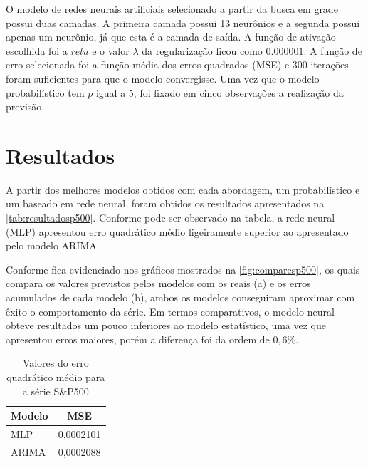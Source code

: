 \documentclass[
    12pt,
    oneside,
    a4paper,
    english,
    brazil
]{abntex2}
\begin{document}
O modelo  de redes neurais artificiais  selecionado a partir da  busca em grade
possui duas camadas.  A primeira camada possui 13 neurônios  e a segunda possui
apenas um  neurônio, já  que esta  é a camada  de saída.  A função  de ativação
escolhida  foi  a $relu$  e  o  valor  $\lambda$  da regularização  ficou  como
$0.000001$. A função de erro selecionada foi a função média dos erros quadrados
(MSE) e 300 iterações foram suficientes  para que o modelo convergisse. Uma vez
que o modelo probabilístico tem $p$ igual  a 5, foi fixado em cinco observações
a realização da previsão.

\chapter{Resultados}\label{chap:result}

A partir  dos melhores  modelos obtidos com  cada abordagem,  um probabilístico
e  um  baseado  em  rede  neural,  foram  obtidos  os  resultados  apresentados
na  \autoref{tab:resultadosp500}.  Conforme pode  ser  observado  na tabela,  a
rede neural  (MLP) apresentou  erro quadrático  médio ligeiramente  superior ao
apresentado pelo modelo ARIMA.

Conforme fica evidenciado nos gráficos mostrados na \autoref{fig:comparesp500},
os quais compara os valores previstos pelos modelos com os reais (a) e os erros
acumulados de cada modelo (b), ambos os modelos conseguiram aproximar com êxito
o  comportamento da  série.  Em  termos comparativos,  o  modelo neural  obteve
resultados um  pouco inferiores ao  modelo estatístico, uma vez  que apresentou
erros maiores, porém a diferença foi da ordem de $0,6\%$.

\begin{table}[ht]
    \centering
    \caption{Valores do erro quadrático médio para a série S\&P500}\label{tab:resultadosp500}
    \begin{tabular}{ll}
        \multicolumn{1}{c}{Modelo} & \multicolumn{1}{c}{MSE} \\
        \toprule
        MLP                        & 0,0002101               \\
        ARIMA                      & 0,0002088
    \end{tabular}
\end{table}
\end{document}
